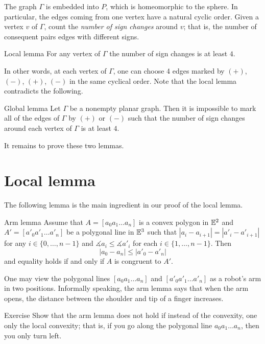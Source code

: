 The graph $\Gamma$ is embedded into $P$, which is homeomorphic to the sphere.
In particular, the edges coming from one vertex have a natural cyclic order. 
Given a vertex $v$ of $\Gamma$, count the \textit{number of sign changes} around $v$;
that is, the number of consequent pairs edges with different signs. 

\begin{thm}{Local lemma}\label{lem:local}
For any vertex of $\Gamma$ the number of sign changes is at least $4$.
\end{thm}

In other words, at each vertex of $\Gamma$, one can choose 4 edges marked by $(+)$, $(-)$, $(+)$, $(-)$ in the same cyclical order.
Note that the local lemma contradicts the following.

\begin{thm}{Global lemma}\label{lem:global}
Let $\Gamma$ be a nonempty planar graph.
Then it is impossible to mark all of the edges of $\Gamma$ by $(+)$ or $(-)$
such that the number of sign changes around each vertex of $\Gamma$ is at least $4$.
\end{thm}

It remains to prove these two lemmas.
\qeds


\section{Local lemma}

The following lemma is the main ingredient in our proof of the local lemma.

\begin{thm}{Arm lemma}\label{lem:arm}
Assume that $A=[a_0 a_1\dots a_n]$ is a convex polygon in $\mathbb{E}^2$
and $A'=[a'_0 a'_1\dots a'_n]$ be a polygonal line in $\mathbb{E}^3$
such that 
$|a_i-a_{i+1}|=|a'_i-a'_{i+1}|$ for any $i\in\{0,\dots,n-1\}$
and 
$\measuredangle a_i\le \measuredangle a'_i$
for each $i\in\{1,\dots,n-1\}$.
Then 
$$|a_0-a_n|\le |a'_0-a'_n|$$
and equality holds if and only if $A$ is congruent to $A'$.
\end{thm}

One may view the polygonal lines $[a_0a_1\dots a_n]$ and $[a'_0a'_1\dots a'_n]$ as a robot's arm in two positions.
Informally speaking, the arm lemma says that when the arm opens,
the distance between the shoulder and tip of a finger increases. 

\begin{thm}{Exercise}\label{ex:arm-nonconvex}
Show that the arm lemma does not hold if 
instead of the convexity,
one only the local convexity;
that is, if you go along the polygonal line $a_0 a_1\dots a_n$, then you only turn left.
\end{thm}

